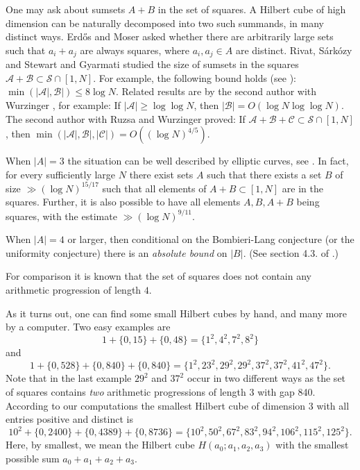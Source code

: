\documentclass[10pt]{amsart}
\theoremstyle{plain}
\def\cal{\mathcal}
\begin{document}
One may ask about sumsets $A+B$ in the set of squares. A Hilbert cube of high dimension 
can be naturally decomposed into two such summands, in many distinct ways.
Erd\H{o}s and Moser asked whether
there are arbitrarily large sets
such that $a_i+a_j$ are always squares, where $a_i, a_j \in A$ are distinct. 
Rivat, S\'{a}rk\'{o}zy and Stewart \cite{RivatSarkozyandStewart} and 
Gyarmati \cite{Gyarmati:2001} studied the size of sumsets in the squares $\cal{A}+\cal{B}\subset \cal{S}\cap [1,N]$.
For example, the following bound holds (see \cite{Gyarmati:2001}):  
$\min (|\cal{A}|, \cal{B}|)\leq 8 \log N$.
Related results are by the second author with Wurzinger \cite{Elsholtz-Wurzinger}, for example:
If $|\cal A|\geq \log \log N$, then $|\cal B| =O(\log N \log \log N)$.
The second author with Ruzsa and Wurzinger \cite{Elsholtz-Ruzsa-Wurzinger} proved:
If $\cal{A}+\cal{B}+\cal{C}\subset \cal{S}\cap [1,N]$, then
$\min (|\cal{A}|, \cal{B}|, |\cal{C}|)=O(( \log N)^{4/5})$.


When $|A|=3$ the situation can be well described by elliptic curves, see \cite{DujellaandElsholtz:2013}.
In fact, for every sufficiently large $N$ there exist sets $A$ such that there exists a set $B$ of size 
$\gg (\log N)^{15/17}$ such that all elements of $A+B\subset [1,N]$ are in the squares. Further, it is also possible to have all elements $A,B,A+B$ being squares, with the estimate
$\gg (\log N)^{9/11}$.

When $|A|=4$ or larger,
then conditional on the Bombieri-Lang conjecture (or the uniformity conjecture) there is an {\emph{absolute bound}} on $|B|$.
(See section 4.3. of \cite{AlonandAngelandBenjaminiandLubetzky:2012}.)

For comparison it is known that the set of squares does not contain any arithmetic progression of length $4$.


As it turns out, one can find some small Hilbert cubes by hand, and many more by a computer.
Two  easy examples are
\[1+\{0,15\}+\{0,48\}=\{1^2,4^2,7^2,8^2\}\]
and
\[1 + \{0, 528\} + \{0, 840\}+ \{0, 840\} = \{1^2, 23^2, 29^2, 29^2, 37^2, 37^2, 41^2, 47^2\}.\]
Note that in the last example $29^2$ and $37^2$ occur in two different ways as the set of squares contains \emph{two} arithmetic progressions of length $3$ with gap 840.
According to our computations the smallest Hilbert cube of dimension 3 with all entries positive and distinct is 
$$
10^2+\{0, 2400\}+\{0, 4389\}+\{0, 8736\}=\{10^2, 50^2, 67^2, 83^2, 94^2, 106^2, 115^2, 125^2\}.
$$
Here, by smallest, we mean the Hilbert cube $H(a_{0}; a_{1}, a_{2}, a_{3})$ with the smallest possible sum $a_{0}+a_{1}+a_{2}+a_{3}$.
\end{document}
